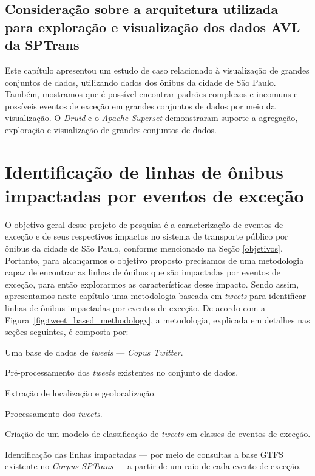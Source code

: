 \documentclass[
	12pt,				%
	oneside,			%
	a4paper,			%
	english,			%
	brazil				%
	]{abntex2ppgsi}
\begin{document}
{{{\section{Consideração sobre a arquitetura utilizada para exploração e visualização dos dados AVL da SPTrans}
\label{viz_case_cons}

Este capítulo apresentou um estudo de caso relacionado à visualização de grandes conjuntos de dados, utilizando dados dos ônibus da cidade de São Paulo. Também, mostramos que é possível encontrar padrões complexos e incomuns e possíveis eventos de exceção em grandes conjuntos de dados por meio da visualização. O \textit{Druid} e o \textit{Apache Superset} demonstraram suporte a agregação, exploração e visualização de grandes conjuntos de dados. 


\chapter{Identificação de linhas de ônibus impactadas por eventos de exceção}
\label{exp1}

O objetivo geral desse projeto de pesquisa é a caracterização de eventos de exceção e de seus respectivos impactos no sistema de transporte público por ônibus da cidade de São Paulo, conforme mencionado na Seção \ref{objetivos}. Portanto, para alcançarmos o objetivo proposto precisamos de uma metodologia capaz de encontrar as linhas de ônibus que são impactadas por eventos de exceção, para então explorarmos as características desse impacto. Sendo assim, apresentamos neste capítulo uma metodologia baseada em \textit{tweets} para identificar linhas de ônibus impactadas por eventos de exceção. De acordo com a Figura~\ref{fig:tweet_based_methodology}, a metodologia, explicada em detalhes nas seções seguintes, é composta por:

\begin{enumerate*}
\item Uma base de dados de \textit{tweets} --- \textit{Copus Twitter}.
\item Pré-processamento dos \textit{tweets} existentes no conjunto de dados.
\item Extração de localização e geolocalização.
\item Processamento dos \textit{tweets}.
\item Criação de um modelo de classificação de \textit{tweets} em classes de eventos de exceção.
\item Identificação das linhas impactadas --- por meio de consultas a base GTFS existente no \textit{Corpus SPTrans} --- a partir de um raio de cada evento de exceção.
\end{enumerate*}

}}}
\end{document}
